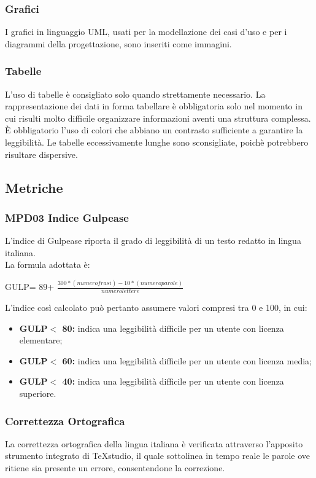 \subsubsection{Grafici}
I grafici in linguaggio UML, usati per la modellazione dei casi d’uso e per i diagrammi della progettazione, sono inseriti come immagini.
\subsubsection{Tabelle}
L’uso di tabelle è consigliato solo quando strettamente necessario.
La rappresentazione dei dati in forma tabellare è obbligatoria solo nel momento in cui risulti molto difficile organizzare informazioni aventi una struttura complessa.
È obbligatorio l’uso di colori che abbiano un contrasto sufficiente a garantire la leggibilità.
Le tabelle eccessivamente lunghe sono sconsigliate, poichè potrebbero risultare dispersive.
\subsection{Metriche}
\subsubsection{MPD03 Indice Gulpease}
L'indice di Gulpease riporta il grado di leggibilità di un testo redatto in lingua italiana.\\
La formula adottata è:
\begin{center}
  GULP= 89+ $\frac{300*(numero frasi)-10*(numero parole)}{numero lettere}$
\end{center}
L'indice così calcolato può pertanto assumere valori compresi tra 0 e 100, in cui:
\begin{itemize}
\item \textbf{GULP$<$ 80:} indica una leggibilità difficile per un utente con licenza elementare;
\item \textbf{GULP$<$ 60:} indica una leggibilità difficile per un utente con licenza media;
\item \textbf{GULP$<$ 40:} indica una leggibilità difficile per un utente con licenza superiore.
\end{itemize}

\subsubsection{Correttezza Ortografica}
La correttezza ortografica della lingua italiana è verificata attraverso l'apposito strumento integrato di \TeX studio, il quale sottolinea in tempo reale le parole ove ritiene sia presente un errore, consentendone la correzione.
